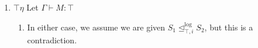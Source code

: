 \documentclass[acmsmall,nonacm]{acmart}
\newcommand{\apreorder}{\trianglelefteq}
\newcommand{\ix}[2]{\mathrel{#1^{#2}}}
\newcommand{\itylrof}[3]{\ilrof{#1}{#3,#2}}
\newcommand{\ilrof}[2]{\mathrel{{#1}^{\text{log}}_{#2}}}
\newcommand{\itylr}[2]{\itylrof{\apreorder}{#1}{#2}}
\newcommand{\result}{\text{result}}
\begin{document}
{\begin{longproof}
\begin{enumerate}
\begin{enumerate}
\begin{align*}
      \end{align*}
      So by anti-reduction it is sufficient to show
      \[ S_1[M[\gamma_1]] \ix\apreorder i \result(S_2[M[\gamma_2]]) \]
      which follows by reflexivity, assumption.
    \item Opposite case is similar.
    \end{enumerate}
  \item $\top\eta$ Let $\Gamma \vdash M : \top$
    \begin{enumerate}
    \item In either case, we assume we are given $S_1 \itylr i \top
      S_2$, but this is a contradiction.
    \end{enumerate}
  \end{enumerate}
\end{longproof}

}
\end{document}
